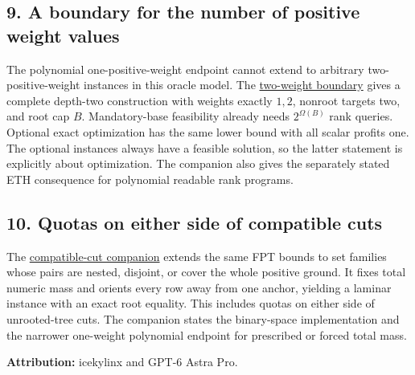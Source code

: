 \hypertarget{af-fe230a140d-a-boundary-for-the-number-of-positive-weight-values}{%
\subsection{9. A boundary for the number of positive weight values}\label{af-fe230a140d-a-boundary-for-the-number-of-positive-weight-values}}

The polynomial one-positive-weight endpoint cannot extend to arbitrary two-positive-weight instances in this oracle model. The \href{https://github.com/icekylinx/algorithm-frontier/blob/main/problems/weighted-prefix-quota-frontier/manuscripts/two-positive-weight-laminar-boundary.md}{two-weight boundary} gives a complete depth-two construction with weights exactly \(1,2\), nonroot targets two, and root cap \(B\). Mandatory-base feasibility already needs \(2^{\Omega(B)}\) rank queries. Optional exact optimization has the same lower bound with all scalar profits one. The optional instances always have a feasible solution, so the latter statement is explicitly about optimization. The companion also gives the separately stated ETH consequence for polynomial readable rank programs.

\hypertarget{af-fe230a140d-quotas-on-either-side-of-compatible-cuts}{%
\subsection{10. Quotas on either side of compatible cuts}\label{af-fe230a140d-quotas-on-either-side-of-compatible-cuts}}

The \href{https://github.com/icekylinx/algorithm-frontier/blob/main/problems/weighted-prefix-quota-frontier/manuscripts/compatible-cut-quota-extension.md}{compatible-cut companion} extends the same FPT bounds to set families whose pairs are nested, disjoint, or cover the whole positive ground. It fixes total numeric mass and orients every row away from one anchor, yielding a laminar instance with an exact root equality. This includes quotas on either side of unrooted-tree cuts. The companion states the binary-space implementation and the narrower one-weight polynomial endpoint for prescribed or forced total mass.

\textbf{Attribution:} icekylinx and GPT-6 Astra Pro.
